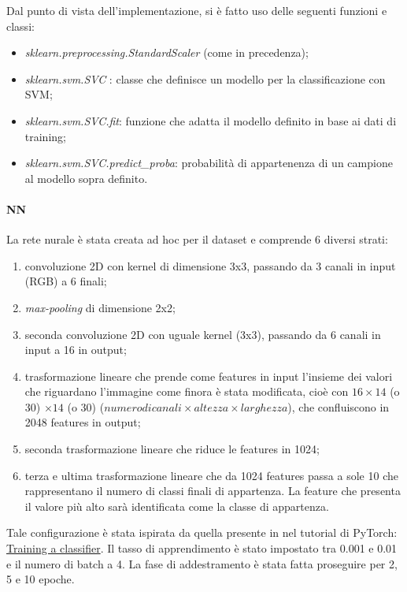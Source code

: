 \documentclass[11pt, a4paper, titlepage]{article}
\begin{document}
\medskip
Dal punto di vista dell'implementazione, si è fatto uso delle seguenti funzioni e classi:
\begin{itemize}
    \item \emph{sklearn.preprocessing.StandardScaler} \cite{scikit-learn} (come in precedenza);
    \item \emph{sklearn.svm.SVC} \cite{scikit-learn}: classe che definisce un modello per la classificazione con SVM;
    \item \emph{sklearn.svm.SVC.fit}: funzione che adatta il modello definito in base ai dati di training;
    \item \emph{sklearn.svm.SVC.predict\_proba}: probabilità di appartenenza di un campione al modello sopra definito.
\end{itemize}

\paragraph{NN}
La rete nurale è stata creata ad hoc per il dataset e comprende 6 diversi strati:
\begin{enumerate}
    \item convoluzione 2D con kernel di dimensione 3x3, passando da 3 canali in input (RGB) a 6 finali;
    \item \emph{max-pooling} di dimensione 2x2;
    \item seconda convoluzione 2D con uguale kernel (3x3), passando da 6 canali in input a 16 in output;
    \item trasformazione lineare che prende come features in input l'insieme dei valori che riguardano l'immagine come finora è stata modificata, cioè con $16 \times 14$ (o 30) $\times 14$ (o 30) ($numero di canali \times altezza \times larghezza$), che confluiscono in 2048 features in output;
    \item seconda trasformazione lineare che riduce le features in 1024;
    \item terza e ultima trasformazione lineare che da 1024 features passa a sole 10 che rappresentano il numero di classi finali di appartenza. La feature che presenta il valore più alto sarà identificata come la classe di appartenza.
\end{enumerate}
Tale configurazione è stata ispirata da quella presente in nel tutorial di PyTorch: \href{https://pytorch.org/tutorials/beginner/blitz/cifar10_tutorial.html}{Training a classifier}. Il tasso di apprendimento è stato impostato tra 0.001 e 0.01 e il numero di batch a 4. La fase di addestramento è stata fatta proseguire per 2, 5 e 10 epoche. 
\end{document}
